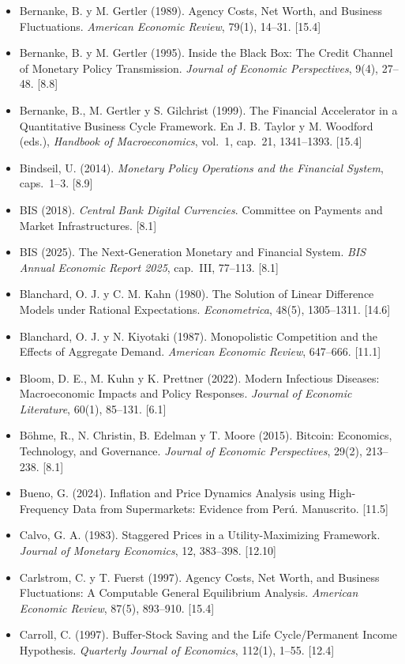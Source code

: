\documentclass[11pt,a4paper]{article}
\begin{document}
{\begin{itemize}[leftmargin=1.4em,itemsep=1pt,label={}]
\item Bernanke, B. y M. Gertler (1989). Agency Costs, Net Worth, and Business Fluctuations. \emph{American Economic Review}, 79(1), 14--31. [15.4]
\item Bernanke, B. y M. Gertler (1995). Inside the Black Box: The Credit Channel of Monetary Policy Transmission. \emph{Journal of Economic Perspectives}, 9(4), 27--48. [8.8]
\item Bernanke, B., M. Gertler y S. Gilchrist (1999). The Financial Accelerator in a Quantitative Business Cycle Framework. En J. B. Taylor y M. Woodford (eds.), \emph{Handbook of Macroeconomics}, vol.~1, cap.~21, 1341--1393. [15.4]
\item Bindseil, U. (2014). \emph{Monetary Policy Operations and the Financial System}, caps.~1--3. [8.9]
\item BIS (2018). \emph{Central Bank Digital Currencies}. Committee on Payments and Market Infrastructures. [8.1]
\item BIS (2025). The Next-Generation Monetary and Financial System. \emph{BIS Annual Economic Report 2025}, cap.~III, 77--113. [8.1]
\item Blanchard, O. J. y C. M. Kahn (1980). The Solution of Linear Difference Models under Rational Expectations. \emph{Econometrica}, 48(5), 1305--1311. [14.6]
\item Blanchard, O. J. y N. Kiyotaki (1987). Monopolistic Competition and the Effects of Aggregate Demand. \emph{American Economic Review}, 647--666. [11.1]
\item Bloom, D. E., M. Kuhn y K. Prettner (2022). Modern Infectious Diseases: Macroeconomic Impacts and Policy Responses. \emph{Journal of Economic Literature}, 60(1), 85--131. [6.1]
\item Böhme, R., N. Christin, B. Edelman y T. Moore (2015). Bitcoin: Economics, Technology, and Governance. \emph{Journal of Economic Perspectives}, 29(2), 213--238. [8.1]
\item Bueno, G. (2024). Inflation and Price Dynamics Analysis using High-Frequency Data from Supermarkets: Evidence from Perú. Manuscrito. [11.5]
\item Calvo, G. A. (1983). Staggered Prices in a Utility-Maximizing Framework. \emph{Journal of Monetary Economics}, 12, 383--398. [12.10]
\item Carlstrom, C. y T. Fuerst (1997). Agency Costs, Net Worth, and Business Fluctuations: A Computable General Equilibrium Analysis. \emph{American Economic Review}, 87(5), 893--910. [15.4]
\item Carroll, C. (1997). Buffer-Stock Saving and the Life Cycle/Permanent Income Hypothesis. \emph{Quarterly Journal of Economics}, 112(1), 1--55. [12.4]

\end{itemize}}
\end{document}
